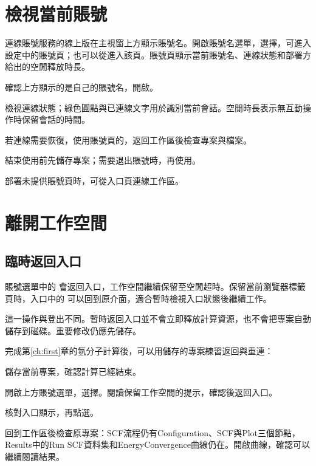 \section{檢視當前賬號}

連線賬號服務的線上版在主視窗上方顯示賬號名。開啟賬號名選單，選擇，可進入設定中的賬號頁；也可以從進入該頁。賬號頁顯示當前賬號名、連線狀態和部署方給出的空閒釋放時長。

\begin{steps}
\item 確認上方顯示的是自己的賬號名，開啟。
\item 檢視連線狀態；綠色圓點與已連線文字用於識別當前會話。空閒時長表示無互動操作時保留會話的時間。
\item 若連線需要恢復，使用賬號頁的，返回工作區後檢查專案與檔案。
\item 結束使用前先儲存專案；需要退出賬號時，再使用。
\end{steps}

部署未提供賬號頁時，可從入口頁連線工作區。


\section{離開工作空間}

\subsection{臨時返回入口}

賬號選單中的  會返回入口，工作空間繼續保留至空閒超時。保留當前瀏覽器標籤頁時，入口中的  可以回到原介面，適合暫時檢視入口狀態後繼續工作。

這一操作與登出不同。暫時返回入口並不會立即釋放計算資源，也不會把專案自動儲存到磁碟。重要修改仍應先儲存。

完成第\ref{ch:first}章的氫分子計算後，可以用儲存的專案練習返回與重連：
\begin{steps}
\item 儲存當前專案，確認計算已經結束。
\item 開啟上方賬號選單，選擇。閱讀保留工作空間的提示，確認後返回入口。
\item 核對入口顯示，再點選。
\item 回到工作區後檢查原專案：SCF流程仍有Configuration、SCF與Plot三個節點，Results中的Run SCF資料集和EnergyConvergence曲線仍在。開啟曲線，確認可以繼續閱讀結果。
\end{steps}

